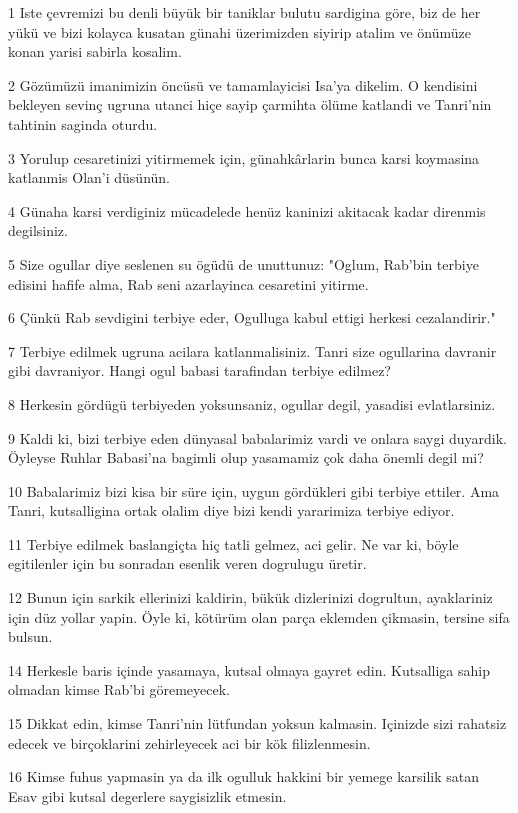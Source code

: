 \par 1 Iste çevremizi bu denli büyük bir taniklar bulutu sardigina göre, biz de her yükü ve bizi kolayca kusatan günahi üzerimizden siyirip atalim ve önümüze konan yarisi sabirla kosalim.
\par 2 Gözümüzü imanimizin öncüsü ve tamamlayicisi Isa'ya dikelim. O kendisini bekleyen sevinç ugruna utanci hiçe sayip çarmihta ölüme katlandi ve Tanri'nin tahtinin saginda oturdu.
\par 3 Yorulup cesaretinizi yitirmemek için, günahkârlarin bunca karsi koymasina katlanmis Olan'i düsünün.
\par 4 Günaha karsi verdiginiz mücadelede henüz kaninizi akitacak kadar direnmis degilsiniz.
\par 5 Size ogullar diye seslenen su ögüdü de unuttunuz: "Oglum, Rab'bin terbiye edisini hafife alma, Rab seni azarlayinca cesaretini yitirme.
\par 6 Çünkü Rab sevdigini terbiye eder, Ogulluga kabul ettigi herkesi cezalandirir."
\par 7 Terbiye edilmek ugruna acilara katlanmalisiniz. Tanri size ogullarina davranir gibi davraniyor. Hangi ogul babasi tarafindan terbiye edilmez?
\par 8 Herkesin gördügü terbiyeden yoksunsaniz, ogullar degil, yasadisi evlatlarsiniz.
\par 9 Kaldi ki, bizi terbiye eden dünyasal babalarimiz vardi ve onlara saygi duyardik. Öyleyse Ruhlar Babasi'na bagimli olup yasamamiz çok daha önemli degil mi?
\par 10 Babalarimiz bizi kisa bir süre için, uygun gördükleri gibi terbiye ettiler. Ama Tanri, kutsalligina ortak olalim diye bizi kendi yararimiza terbiye ediyor.
\par 11 Terbiye edilmek baslangiçta hiç tatli gelmez, aci gelir. Ne var ki, böyle egitilenler için bu sonradan esenlik veren dogrulugu üretir.
\par 12 Bunun için sarkik ellerinizi kaldirin, bükük dizlerinizi dogrultun, ayaklariniz için düz yollar yapin. Öyle ki, kötürüm olan parça eklemden çikmasin, tersine sifa bulsun.
\par 14 Herkesle baris içinde yasamaya, kutsal olmaya gayret edin. Kutsalliga sahip olmadan kimse Rab'bi göremeyecek.
\par 15 Dikkat edin, kimse Tanri'nin lütfundan yoksun kalmasin. Içinizde sizi rahatsiz edecek ve birçoklarini zehirleyecek aci bir kök filizlenmesin.
\par 16 Kimse fuhus yapmasin ya da ilk ogulluk hakkini bir yemege karsilik satan Esav gibi kutsal degerlere saygisizlik etmesin.
